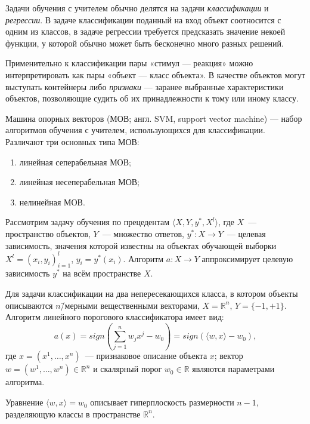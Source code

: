 Задачи обучения с учителем обычно делятся на задачи \textit{классификации} и \textit{регрессии}. В задаче классификации поданный на вход объект соотносится с одним из классов, в задаче регрессии требуется предсказать значение некоей функции, у которой обычно может быть бесконечно много разных решений.

Применительно к классификации пары «стимул --- реакция» можно интерпретировать как пары «объект --- класс объекта». В качестве объектов могут выступать контейнеры либо \textit{признаки} --- заранее выбранные характеристики объектов, позволяющие судить об их принадлежности к тому или иному классу.

Машина опорных векторов (МОВ; англ. SVM, support vector machine) --- набор алгоритмов обучения с учителем, использующихся для классификации. Различают три основных типа МОВ:
\begin{enumerate}
\item линейная сеперабельная МОВ;
\item линейная несеперабельная МОВ;
\item нелинейная МОВ.
\end{enumerate}

Рассмотрим задачу обучения по прецедентам $ \langle X, Y, y^*, X^l \rangle $, где $ X $~--- пространство объектов, $ Y $~--- множество ответов, $ y^*: X \to Y $~--- целевая зависимость, значения которой известны на объектах обучающей выборки $ X^l = (x_i, y_i)_{i = 1}^l $, $ y_i = y^*(x_i) $. Алгоритм $ a: X \to Y $ аппроксимирует целевую зависимость $ y^* $ на всём пространстве $ X $.

Для задачи классификации на два непересекающихся класса, в котором объекты описываются $ n $\=/мерными вещественными векторами, $ X = \mathbb{R}^n $, $ Y = \{-1, +1\} $. Алгоритм линейного порогового классификатора имеет вид:
\begin{equation*}
a(x) = sign(\sum_{j = 1}^n w_j x^j - w_0) = sign(\langle w, x \rangle - w_0),
\end{equation*}
где $ x = (x^1, \ldots, x^n) $~--- признаковое описание объекта $ x $; вектор $ w = (w^1, \ldots, w^n) \in \mathbb{R}^n $ и скалярный порог $ w_0 \in \mathbb{R} $ являются параметрами алгоритма.

Уравнение $ \langle w, x \rangle = w_0 $ описывает гиперплоскость размерности $ n - 1 $, разделяющую классы в пространстве $ \mathbb{R}^n $.


